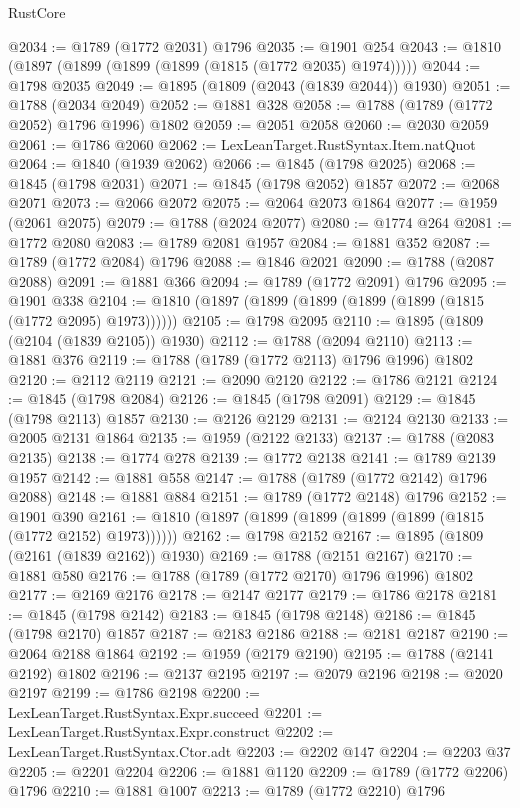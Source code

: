 \begin{lexlean}{RustCore}
\begin{coremodule}
@2034 := @1789 (@1772 @2031) @1796
@2035 := @1901 @254
@2043 := @1810 (@1897 (@1899 (@1899 (@1899 (@1815 (@1772 @2035) @1974)))))
@2044 := @1798 @2035
@2049 := @1895 (@1809 (@2043 (@1839 @2044)) @1930)
@2051 := @1788 (@2034 @2049)
@2052 := @1881 @328
@2058 := @1788 (@1789 (@1772 @2052) @1796 @1996) @1802
@2059 := @2051 @2058
@2060 := @2030 @2059
@2061 := @1786 @2060
@2062 := LexLeanTarget.RustSyntax.Item.natQuot
@2064 := @1840 (@1939 @2062)
@2066 := @1845 (@1798 @2025)
@2068 := @1845 (@1798 @2031)
@2071 := @1845 (@1798 @2052) @1857
@2072 := @2068 @2071
@2073 := @2066 @2072
@2075 := @2064 @2073 @1864
@2077 := @1959 (@2061 @2075)
@2079 := @1788 (@2024 @2077)
@2080 := @1774 @264
@2081 := @1772 @2080
@2083 := @1789 @2081 @1957
@2084 := @1881 @352
@2087 := @1789 (@1772 @2084) @1796
@2088 := @1846 @2021
@2090 := @1788 (@2087 @2088)
@2091 := @1881 @366
@2094 := @1789 (@1772 @2091) @1796
@2095 := @1901 @338
@2104 := @1810 (@1897 (@1899 (@1899 (@1899 (@1899 (@1815 (@1772 @2095) @1973))))))
@2105 := @1798 @2095
@2110 := @1895 (@1809 (@2104 (@1839 @2105)) @1930)
@2112 := @1788 (@2094 @2110)
@2113 := @1881 @376
@2119 := @1788 (@1789 (@1772 @2113) @1796 @1996) @1802
@2120 := @2112 @2119
@2121 := @2090 @2120
@2122 := @1786 @2121
@2124 := @1845 (@1798 @2084)
@2126 := @1845 (@1798 @2091)
@2129 := @1845 (@1798 @2113) @1857
@2130 := @2126 @2129
@2131 := @2124 @2130
@2133 := @2005 @2131 @1864
@2135 := @1959 (@2122 @2133)
@2137 := @1788 (@2083 @2135)
@2138 := @1774 @278
@2139 := @1772 @2138
@2141 := @1789 @2139 @1957
@2142 := @1881 @558
@2147 := @1788 (@1789 (@1772 @2142) @1796 @2088)
@2148 := @1881 @884
@2151 := @1789 (@1772 @2148) @1796
@2152 := @1901 @390
@2161 := @1810 (@1897 (@1899 (@1899 (@1899 (@1899 (@1815 (@1772 @2152) @1973))))))
@2162 := @1798 @2152
@2167 := @1895 (@1809 (@2161 (@1839 @2162)) @1930)
@2169 := @1788 (@2151 @2167)
@2170 := @1881 @580
@2176 := @1788 (@1789 (@1772 @2170) @1796 @1996) @1802
@2177 := @2169 @2176
@2178 := @2147 @2177
@2179 := @1786 @2178
@2181 := @1845 (@1798 @2142)
@2183 := @1845 (@1798 @2148)
@2186 := @1845 (@1798 @2170) @1857
@2187 := @2183 @2186
@2188 := @2181 @2187
@2190 := @2064 @2188 @1864
@2192 := @1959 (@2179 @2190)
@2195 := @1788 (@2141 @2192) @1802
@2196 := @2137 @2195
@2197 := @2079 @2196
@2198 := @2020 @2197
@2199 := @1786 @2198
@2200 := LexLeanTarget.RustSyntax.Expr.succeed
@2201 := LexLeanTarget.RustSyntax.Expr.construct
@2202 := LexLeanTarget.RustSyntax.Ctor.adt
@2203 := @2202 @147
@2204 := @2203 @37
@2205 := @2201 @2204
@2206 := @1881 @1120
@2209 := @1789 (@1772 @2206) @1796
@2210 := @1881 @1007
@2213 := @1789 (@1772 @2210) @1796

\end{coremodule}
\end{lexlean}
